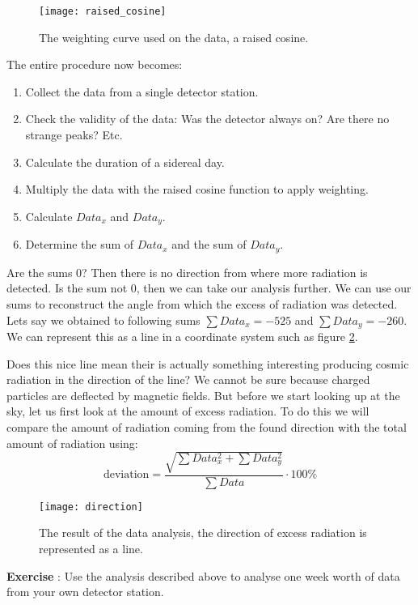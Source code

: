 \begin{figure}\begin{center}
\texttt{[image: raised\_cosine]}
\caption{The weighting curve used on the data, a raised cosine.}\label{fig:raised_cosine}
\end{center}\end{figure}

The entire procedure now becomes:
\begin{enumerate}[1.]
\item Collect the data from a single detector station.
\item Check the validity of the data: Was the detector always on? Are there no strange peaks? Etc.
\item Calculate the duration of a sidereal day.
\item Multiply the data with the raised cosine function to apply weighting.
\item Calculate $Data_x$ and $Data_y$.
\item Determine the sum of $Data_x$ and the sum of $Data_y$.
\end{enumerate}
Are the sums 0? Then there is no direction from where more radiation is detected. Is the sum not 0, then we can take our analysis further. We can use our sums to reconstruct the angle from which the excess of radiation was detected. Lets say we obtained to following sums $\sum Data_x = -525$  and $\sum Data_y = -260$. We can represent this as a line in a coordinate system such as figure \ref{fig:direction}.

Does this nice line mean their is actually something interesting producing cosmic radiation in the direction of the line? We cannot be sure because charged particles are deflected by magnetic fields. But before we start looking up at the sky, let us first look at the amount of excess radiation. To do this we will compare the amount of radiation coming from the found direction with the total amount of radiation using:
\begin{equation} \mbox{deviation} = \frac{\sqrt{\sum Data_x^2 + \sum Data_y ^2}}{\sum Data} \cdot 100\% \end{equation}

\begin{figure}\begin{center}
\texttt{[image: direction]}
\caption{The result of the data analysis, the direction of excess radiation is represented as a line.}\label{fig:direction}
\end{center}\end{figure}

\begin{shaded}
\textbf{Exercise \theExercise {}} : Use the analysis described above to analyse one week worth of data from your own detector station.\end{shaded}


